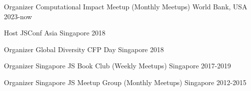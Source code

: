 



\begin{cvhonors}

  \cvhonor
    {Organizer} %
    {Computational Impact Meetup (Monthly Meetups)} %
    {World Bank, USA} %
    {2023-now} %

  \cvhonor
    {Host} %
    {JSConf Asia} %
    {Singapore} %
    {2018} %

  \cvhonor
    {Organizer} %
    {Global Diversity CFP Day} %
    {Singapore} %
    {2018} %

  \cvhonor
    {Organizer} %
    {Singapore JS Book Club (Weekly Meetups)} %
    {Singapore} %
    {2017-2019} %

  \cvhonor
    {Organizer} %
    {Singapore JS Meetup Group (Monthly Meetups)} %
    {Singapore} %
    {2012-2015} %

\end{cvhonors}




